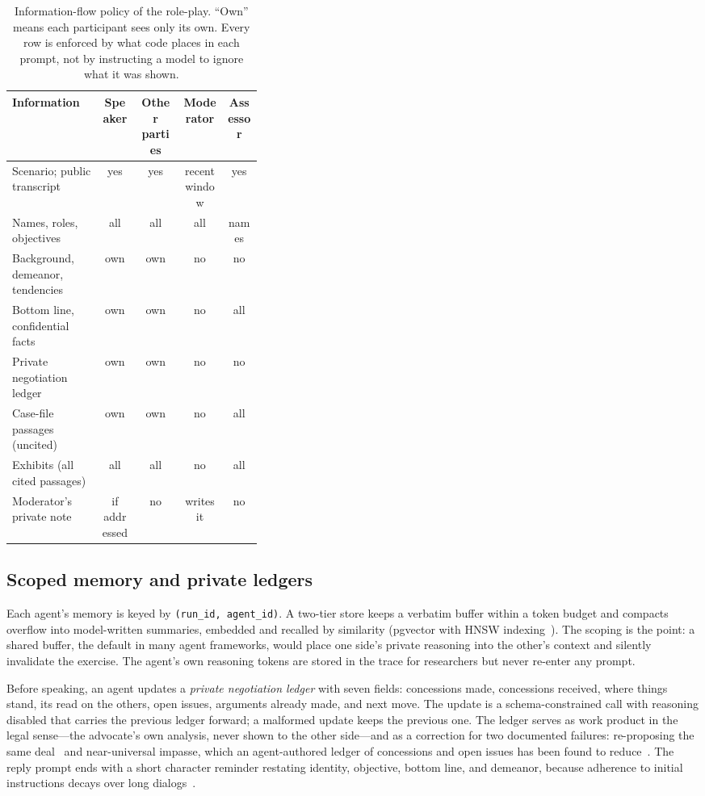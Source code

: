 \documentclass[acmsmall,screen,review]{acmart}
\newcommand{\code}[1]{\texttt{\small #1}}
\begin{document}
\begin{table}[t]
\caption{Information-flow policy of the role-play. ``Own'' means each participant sees only its own. Every row is enforced by what code places in each prompt, not by instructing a model to ignore what it was shown.}
\label{tab:visibility}
\small
\begin{tabular}{@{}p{0.36\linewidth}cccc@{}}
\toprule
Information & Speaker & Other parties & Moderator & Assessor \\
\midrule
Scenario; public transcript & yes & yes & recent window & yes \\
Names, roles, objectives & all & all & all & names \\
Background, demeanor, tendencies & own & own & no & no \\
Bottom line, confidential facts & own & own & no & all \\
Private negotiation ledger & own & own & no & no \\
Case-file passages (uncited) & own & own & no & all \\
Exhibits (all cited passages) & all & all & no & all \\
Moderator's private note & if addressed & no & writes it & no \\
\bottomrule
\end{tabular}
\end{table}

\subsection{Scoped memory and private ledgers}
\label{sec:memory}

Each agent's memory is keyed by \code{(run\_id, agent\_id)}. A two-tier store keeps a verbatim buffer within a token budget and compacts overflow into model-written summaries, embedded and recalled by similarity (pgvector with HNSW indexing~\cite{pgvector}). The scoping is the point: a shared buffer, the default in many agent frameworks, would place one side's private reasoning into the other's context and silently invalidate the exercise. The agent's own reasoning tokens are stored in the trace for researchers but never re-enter any prompt.

Before speaking, an agent updates a \emph{private negotiation ledger} with seven fields: concessions made, concessions received, where things stand, its read on the others, open issues, arguments already made, and next move. The update is a schema-constrained call with reasoning disabled that carries the previous ledger forward; a malformed update keeps the previous one. The ledger serves as work product in the legal sense---the advocate's own analysis, never shown to the other side---and as a correction for two documented failures: re-proposing the same deal~\cite{abdelnabi2023negotiation} and near-universal impasse, which an agent-authored ledger of concessions and open issues has been found to reduce~\cite{andric2026diversity}. The reply prompt ends with a short character reminder restating identity, objective, bottom line, and demeanor, because adherence to initial instructions decays over long dialogs~\cite{li2024instability}.
\end{document}
